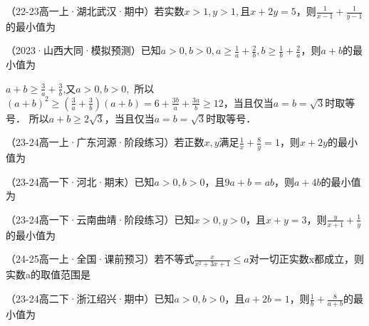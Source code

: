 \begin{hmwk}
    （22-23高一上·湖北武汉·期中）若实数$x>1,y>1,$且$x+2y=5$，则$\displaystyle \frac{1}{x-1}+\frac{1}{y-1}$的最小值为
\end{hmwk}

\begin{hmwk}
    （2023·山西大同·模拟预测）已知$\displaystyle a>0,b>0,a\ge \frac{1}{a}+\frac{2}{b},b \ge \frac{1}{b}+\frac{2}{a}$，则$a+b$的最小值为
    \begin{jiexi}
    $\displaystyle a+b \ge \frac{3}{a}+\frac{3}{b}$,又$a>0,b>0,$
    所以$\displaystyle (a+b)^2 \ge (\frac{3}{a}+\frac{3}{b})(a+b)=6+\frac{3b}{a}+\frac{3a}{b}\ge 12$，当且仅当$a=b=\sqrt{3}$时取等号．
    所以$a+b\ge2\sqrt{3}$，当且仅当$a=b=\sqrt{3}$时取等号．
    \end{jiexi}
\end{hmwk}

\begin{hmwk}
    （23-24高一上·广东河源·阶段练习）若正数$x,y$满足$\displaystyle \frac{1}{x}+\frac{8}{y}=1$，则$x+2y$的最小值为
\end{hmwk}

\begin{hmwk}
    （23-24高一下·河北·期末）已知$a>0,b>0$，且$9a+b=ab$，则$a+4b$的最小值为
\end{hmwk}

\begin{hmwk}
    （23-24高一下·云南曲靖·阶段练习）已知$x>0,y>0$，且$x+y=3$，则$\displaystyle \frac{y}{x+1}+\frac{1}{y}$的最小值为
\end{hmwk}

\begin{hmwk}
    （24-25高一上·全国·课前预习）若不等式$\displaystyle \frac{x}{x^2+3x+1}\le a$对一切正实数x都成立，则实数a的取值范围是\tiankong{$[\frac{1}{5},+\infty)$}
\end{hmwk}

\begin{hmwk}
    （23-24高二下·浙江绍兴·期中）已知$a>0,b>0$，且$a+2b=1$，则$\displaystyle \frac{1}{b}+\frac{8}{a+b}$的最小值为
\end{hmwk}

